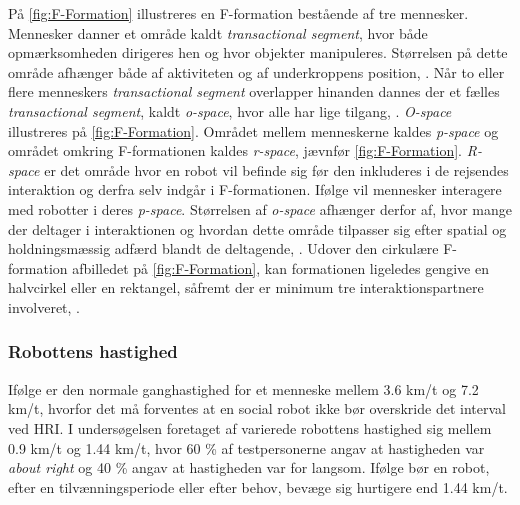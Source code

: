 På \autoref{fig:F-Formation} illustreres en F-formation bestående af tre mennesker. Mennesker danner et område kaldt \textit{transactional segment}, hvor både opmærksomheden dirigeres hen og hvor objekter manipuleres. Størrelsen på dette område afhænger både af aktiviteten og af underkroppens position, \parencite[s. 446]{PDF:UsingFFormations}. Når to eller flere menneskers \textit{transactional segment} overlapper hinanden dannes der et fælles \textit{transactional segment}, kaldt \textit{o-space}, hvor alle har lige tilgang, \parencite[s. 446]{PDF:UsingFFormations}. \textit{O-space} illustreres på \autoref{fig:F-Formation}. Området mellem menneskerne kaldes \textit{p-space} og området omkring F-formationen kaldes \textit{r-space}, jævnfør \autoref{fig:F-Formation}. \textit{R-space} er det område hvor en robot vil befinde sig før den inkluderes i de rejsendes interaktion og derfra selv indgår i F-formationen. Ifølge \textcite[s. 41]{PDF:GroupVSIndividual} vil mennesker interagere med robotter i deres  \textit{p-space}. Størrelsen af \textit{o-space} afhænger derfor af, hvor mange der deltager i interaktionen og hvordan dette område tilpasser sig efter spatial og holdningsmæssig adfærd blandt de deltagende, \parencite[s. 446]{PDF:UsingFFormations}. Udover den cirkulære F-formation afbilledet på \autoref{fig:F-Formation}, kan formationen ligeledes gengive en halvcirkel eller en rektangel, såfremt der er minimum tre interaktionspartnere involveret, \parencite[s. 446]{PDF:UsingFFormations}.   
%

\subsubsection*{Robottens hastighed}
\label{InteraktionSocialeRobotterParametreBevaegelsesmoenstreHastighed}
%
Ifølge \textcite[s. 165]{PDF:HumanRobotEmodiedInteraction} er den normale ganghastighed for et menneske mellem 3.6 km/t og 7.2 km/t, hvorfor det må forventes at en social robot ikke bør overskride det interval ved HRI. I undersøgelsen foretaget af \textcite[s. 175]{PDF:HowMayIServeYou} varierede robottens hastighed sig mellem 0.9 km/t og 1.44 km/t, hvor 60 \% af testpersonerne angav at hastigheden var \textit{about right} og 40 \% angav at hastigheden var for langsom. Ifølge \textcite[s. 178]{PDF:HowMayIServeYou} bør en robot, efter en tilvænningsperiode eller efter behov, bevæge sig hurtigere end 1.44 km/t. 

